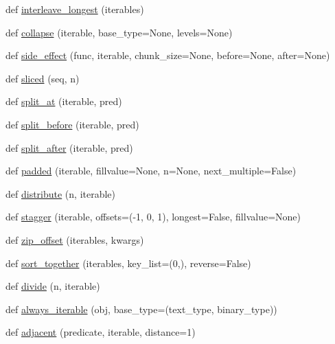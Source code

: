 \begin{DoxyCompactItemize}
\item 
def \hyperlink{namespacemore__itertools_1_1more_a57434352338eae6f24776d26c8040686}{interleave\+\_\+longest} (iterables)
\item 
def \hyperlink{namespacemore__itertools_1_1more_a59642897c4fa29478c401846a74410b8}{collapse} (iterable, base\+\_\+type=None, levels=None)
\item 
def \hyperlink{namespacemore__itertools_1_1more_a178dcece0d94e096739857ecdf7aee26}{side\+\_\+effect} (func, iterable, chunk\+\_\+size=None, before=None, after=None)
\item 
def \hyperlink{namespacemore__itertools_1_1more_a15147eb2896fda44f7e6a5c35ca2457d}{sliced} (seq, n)
\item 
def \hyperlink{namespacemore__itertools_1_1more_a07d0efe8d88585439d31fc758762b749}{split\+\_\+at} (iterable, pred)
\item 
def \hyperlink{namespacemore__itertools_1_1more_a773eb80f47263555be2b28b15ec33751}{split\+\_\+before} (iterable, pred)
\item 
def \hyperlink{namespacemore__itertools_1_1more_a2d8834aefe73a3081dec6e364edc5099}{split\+\_\+after} (iterable, pred)
\item 
def \hyperlink{namespacemore__itertools_1_1more_a8eb43aaef11e295f0f564a2b276d5908}{padded} (iterable, fillvalue=None, n=None, next\+\_\+multiple=False)
\item 
def \hyperlink{namespacemore__itertools_1_1more_a58e045549121b45641e6390fc65f3a28}{distribute} (n, iterable)
\item 
def \hyperlink{namespacemore__itertools_1_1more_a1b14bae5bc7cfc92c1f8b6f530e09119}{stagger} (iterable, offsets=(-\/1, 0, 1), longest=False, fillvalue=None)
\item 
def \hyperlink{namespacemore__itertools_1_1more_a9898bce28b34ec9ed161170fe2ee6151}{zip\+\_\+offset} (iterables, kwargs)
\item 
def \hyperlink{namespacemore__itertools_1_1more_a894ede945f23273a08f9d4a3a1a16c15}{sort\+\_\+together} (iterables, key\+\_\+list=(0,), reverse=False)
\item 
def \hyperlink{namespacemore__itertools_1_1more_a363458a199debec3da9306dc6e182f83}{divide} (n, iterable)
\item 
def \hyperlink{namespacemore__itertools_1_1more_a18526fd8c54116687234dd106355fa14}{always\+\_\+iterable} (obj, base\+\_\+type=(text\+\_\+type, binary\+\_\+type))
\item 
def \hyperlink{namespacemore__itertools_1_1more_a9d8438b6750db28c58f458f9484dce45}{adjacent} (predicate, iterable, distance=1)

\end{DoxyCompactItemize}
